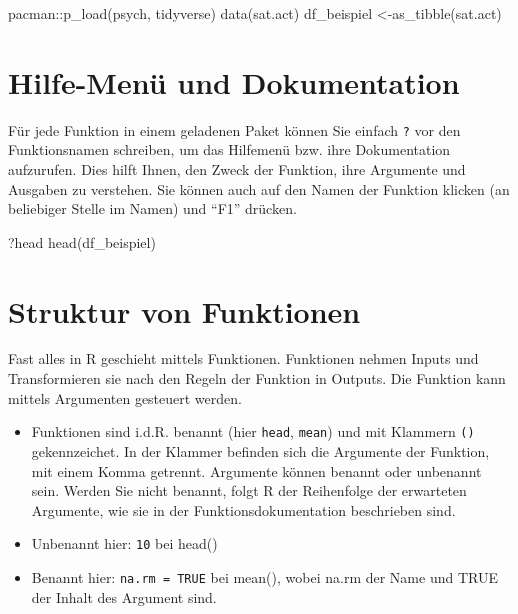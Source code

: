 \documentclass[
  letterpaper,
  DIV=11,
  numbers=noendperiod]{scrreprt}
\newenvironment{Shaded}{\begin{snugshade}}{\end{snugshade}}
\newcommand{\FunctionTok}[1]{\textcolor[rgb]{0.28,0.35,0.67}{#1}}
\newcommand{\NormalTok}[1]{\textcolor[rgb]{0.00,0.23,0.31}{#1}}
\newcommand{\OtherTok}[1]{\textcolor[rgb]{0.00,0.23,0.31}{#1}}
\newcommand{\SpecialCharTok}[1]{\textcolor[rgb]{0.37,0.37,0.37}{#1}}
\providecommand{\tightlist}{%
  \setlength{\itemsep}{0pt}\setlength{\parskip}{0pt}}\usepackage{longtable,booktabs,array}
\begin{document}
\begin{Shaded}
\begin{Highlighting}[]
\NormalTok{pacman}\SpecialCharTok{::}\FunctionTok{p\_load}\NormalTok{(psych, tidyverse)}
\FunctionTok{data}\NormalTok{(sat.act)}
\NormalTok{df\_beispiel }\OtherTok{\textless{}{-}}\FunctionTok{as\_tibble}\NormalTok{(sat.act)}
\end{Highlighting}
\end{Shaded}


\chapter{Hilfe-Menü und
Dokumentation}\label{hilfe-menuxfc-und-dokumentation}

Für jede Funktion in einem geladenen Paket können Sie einfach \texttt{?}
vor den Funktionsnamen schreiben, um das Hilfemenü bzw. ihre
Dokumentation aufzurufen. Dies hilft Ihnen, den Zweck der Funktion, ihre
Argumente und Ausgaben zu verstehen. Sie können auch auf den Namen der
Funktion klicken (an beliebiger Stelle im Namen) und ``F1'' drücken.

\begin{Shaded}
\begin{Highlighting}[]
\NormalTok{?head}
\FunctionTok{head}\NormalTok{(df\_beispiel)}
\end{Highlighting}
\end{Shaded}


\chapter{Struktur von Funktionen}\label{struktur-von-funktionen}

Fast alles in R geschieht mittels Funktionen. Funktionen nehmen Inputs
und Transformieren sie nach den Regeln der Funktion in Outputs. Die
Funktion kann mittels Argumenten gesteuert werden.

\begin{itemize}
\tightlist
\item
  Funktionen sind i.d.R. benannt (hier \texttt{head}, \texttt{mean}) und
  mit Klammern \texttt{()} gekennzeichet. In der Klammer befinden sich
  die Argumente der Funktion, mit einem Komma getrennt. Argumente können
  benannt oder unbenannt sein. Werden Sie nicht benannt, folgt R der
  Reihenfolge der erwarteten Argumente, wie sie in der
  Funktionsdokumentation beschrieben sind.
\item
  Unbenannt hier: \texttt{10} bei head()
\item
  Benannt hier: \texttt{na.rm\ =\ TRUE} bei mean(), wobei na.rm der Name
  und TRUE der Inhalt des Argument sind.
\end{itemize}
\end{document}
